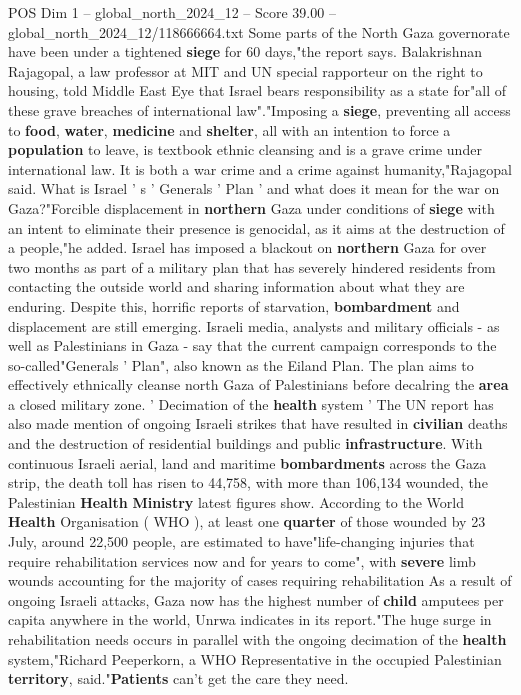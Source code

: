 \begin{textsample}{POS Dim 1 – global\_north\_2024\_12 – Score 39.00 – global\_north\_2024\_12/118666664.txt}
Some parts of the North Gaza governorate have been under a tightened \textbf{siege} for 60 days,"the report says.
Balakrishnan Rajagopal, a law professor at MIT and UN special rapporteur on the right to housing, told Middle East Eye that Israel bears responsibility as a state for"all of these grave breaches of international law"."Imposing a \textbf{siege}, preventing all access to \textbf{food}, \textbf{water}, \textbf{medicine} and \textbf{shelter}, all with an intention to force a \textbf{population} to leave, is textbook ethnic cleansing and is a grave crime under international law.
It is both a war crime and a crime against humanity,"Rajagopal said.
What is Israel ' s ' Generals ' Plan ' and what does it mean for the war on Gaza?"Forcible displacement in \textbf{northern} Gaza under conditions of \textbf{siege} with an intent to eliminate their presence is genocidal, as it aims at the destruction of a people,"he added.
Israel has imposed a blackout on \textbf{northern} Gaza for over two months as part of a military plan that has severely hindered residents from contacting the outside world and sharing information about what they are enduring.
Despite this, horrific reports of starvation, \textbf{bombardment} and displacement are still emerging.
Israeli media, analysts and military officials - as well as Palestinians in Gaza - say that the current campaign corresponds to the so-called"Generals ' Plan", also known as the Eiland Plan.
The plan aims to effectively ethnically cleanse north Gaza of Palestinians before decalring the \textbf{area} a closed military zone. ' Decimation of the \textbf{health} system ' The UN report has also made mention of ongoing Israeli strikes that have resulted in \textbf{civilian} deaths and the destruction of residential buildings and public \textbf{infrastructure}.
With continuous Israeli aerial, land and maritime \textbf{bombardments} across the Gaza strip, the death toll has risen to 44,758, with more than 106,134 wounded, the Palestinian \textbf{Health} \textbf{Ministry} latest figures show.
According to the World \textbf{Health} Organisation ( WHO ), at least one \textbf{quarter} of those wounded by 23 July, around 22,500 people, are estimated to have"life-changing injuries that require rehabilitation services now and for years to come", with \textbf{severe} limb wounds accounting for the majority of cases requiring rehabilitation As a result of ongoing Israeli attacks, Gaza now has the highest number of \textbf{child} amputees per capita anywhere in the world, Unrwa indicates in its report."The huge surge in rehabilitation needs occurs in parallel with the ongoing decimation of the \textbf{health} system,"Richard Peeperkorn, a WHO Representative in the occupied Palestinian \textbf{territory}, said."\textbf{Patients} can't get the care they need.

\end{textsample}
